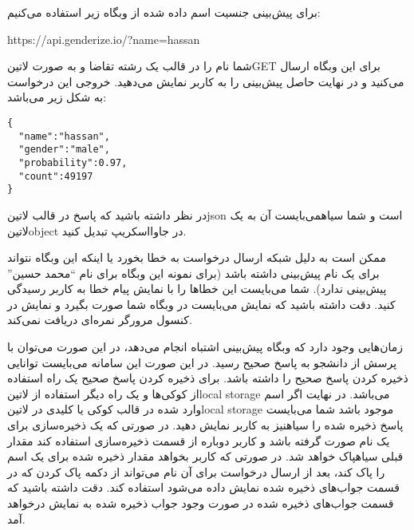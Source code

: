 \documentclass[../main.tex]{subfiles}
\begin{document}
برای پیش‌بینی جنسیت اسم داده شده از وبگاه زیر استفاده می‌کنیم:

\begin{latin}\begin{center}
https://api.genderize.io/?name=hassan
\end{center}\end{latin}

شما نام را در قالب یک رشته تقاضا و به صورت ‌لاتین{GET} برای این وبگاه ارسال می‌کنید و در نهایت حاصل پیش‌بینی را به کاربر نمایش می‌دهید. خروجی این درخواست به شکل زیر می‌باشد:

\begin{latin}
\begin{verbatim}
{
  "name":"hassan",
  "gender":"male",
  "probability":0.97,
  "count":49197
}
\end{verbatim}
\end{latin}

در نظر داشته باشید که پاسخ در قالب ‌لاتین{json} است و شما ‌سیاه{می‌بایست} آن به یک ‌لاتین{object} در جاوااسکریپ تبدیل کنید.

ممکن است به دلیل شبکه ارسال درخواست به خطا بخورد یا اینکه این وبگاه نتواند برای یک نام پیش‌بینی داشته باشد (برای نمونه این وبگاه برای نام ``محمد حسین'' پیش‌بینی ندارد). شما می‌بایست این خطاها را با نمایش پیام خطا به کاربر رسیدگی کنید. دقت داشته باشید که نمایش می‌بایست در وبگاه شما صورت بگیرد و نمایش در کنسول مرورگر نمره‌ای دریافت نمی‌کند.

زمان‌هایی وجود دارد که وبگاه پیش‌بینی اشتباه انجام می‌دهد، در این صورت می‌توان با پرسش از دانشجو به پاسخ صحیح رسید. در این صورت این سامانه می‌بایست توانایی ذخیره کردن پاسخ صحیح را داشته باشد. برای ذخیره کردن پاسخ صحیح یک راه استفاده از کوکی‌ها و یک راه دیگر استفاده از ‌لاتین{local storage} می‌باشد.
در نهایت اگر اسم وارد شده در قالب کوکی یا کلیدی در ‌لاتین{local storage} موجود باشد شما می‌بایست پاسخ ذخیره شده را ‌سیاه{نیز} به کاربر نمایش دهید.
در صورتی که یک ذخیره‌سازی برای یک نام صورت گرفته باشد و کاربر دوباره از قسمت ذخیره‌سازی استفاده کند مقدار قبلی ‌سیاه{پاک} خواهد شد.
در صورتی که کاربر بخواهد مقدار ذخیره شده برای یک اسم را پاک کند، بعد از ارسال درخواست برای آن نام می‌تواند از دکمه پاک کردن که در قسمت جواب‌های ذخیره شده نمایش داده می‌شود استفاده کند. دقت داشته باشید که قسمت جواب‌های ذخیره شده
در صورت وجود جواب ذخیره شده به نمایش درخواهد آمد.

\end{document}

